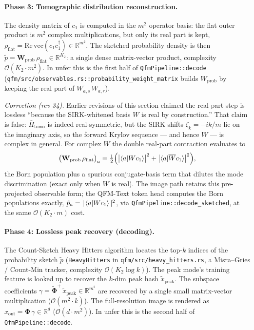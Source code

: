 \documentclass[11pt, a4paper]{article}
\newcommand{\Rset}{\mathbb{R}}
\begin{document}
\paragraph{Phase 3: Tomographic distribution reconstruction.} The density
matrix of $c_1$ is computed in the $m^2$ operator basis: the flat outer
product is $m^2$ complex multiplications, but only its real part is kept,
$\rho_{\mathrm{flat}}=\mathrm{Re}\,\mathrm{vec}(c_1c_1^\dagger)\in\Rset^{m^2}$.
The sketched probability density is then
$\tilde p=\mathbf{W}_{\mathrm{prob}}\,\rho_{\mathrm{flat}}\in\Rset^{K_2}$:
a single dense matrix-vector product, complexity $\mathcal{O}(K_2\cdot m^2)$.
In unfer this is the first half of \texttt{QfmPipeline::decode}
(\texttt{qfm/src/observables.rs::probability\_weight\_matrix} builds
$W_{\mathrm{prob}}$ by keeping the real part of
$\overline{W_{a,s}}\,W_{a,r}$).

\emph{Correction (rev 34).} Earlier revisions of this section claimed the
real-part step is lossless ``because the SIRK-whitened basis $W$ is real
by construction.'' That claim is false: $\bar H_{\mathrm{tomo}}$ is indeed
real-symmetric, but the SIRK shifts $\zeta_k=-ik/m$ lie on the imaginary
axis, so the forward Krylov sequence --- and hence $W$ --- is complex in
general. For complex $W$ the double real-part contraction evaluates to
\begin{equation}
  \bigl(\mathbf{W}_{\mathrm{prob}}\,\rho_{\mathrm{flat}}\bigr)_a
  =\tfrac12\Bigl(\bigl|\braket{a|Wc_1}\bigr|^2
  +\bigl|\braket{a|\overline{W}c_1}\bigr|^2\Bigr),
\end{equation}
the Born population plus a spurious conjugate-basis term that dilutes the
mode discrimination (exact only when $W$ is real). The image path retains
this pre-projected observable form; the QFM-Text token head computes the
Born populations exactly, $\tilde p_a=|\braket{a|Wc_1}|^2$, via
\texttt{QfmPipeline::decode\_sketched}, at the same
$\mathcal{O}(K_2\cdot m)$ cost.

\paragraph{Phase 4: Lossless peak recovery (decoding).} The Count-Sketch
Heavy Hitters algorithm locates the top-$k$ indices of the probability sketch
$\tilde p$ (\texttt{HeavyHitters} in \texttt{qfm/src/heavy\_hitters.rs}, a
Misra--Gries / Count-Min tracker, complexity $\mathcal{O}(K_2\log k)$). The
peak mode's training feature is looked up to recover the $k$-dim peak hash
$\tilde x_{\mathrm{peak}}$. The subspace coefficients
$\gamma=\tilde{\mathbf\Phi}^+\,\tilde x_{\mathrm{peak}}\in\Rset^{m^2}$ are
recovered by a single small matrix-vector multiplication
($\mathcal{O}(m^2\cdot k)$). The full-resolution image is rendered as
$x_{\mathrm{out}}=\mathbf\Phi\,\gamma\in\Rset^d$ ($\mathcal{O}(d\cdot m^2)$).
In unfer this is the second half of \texttt{QfmPipeline::decode}.
\end{document}

